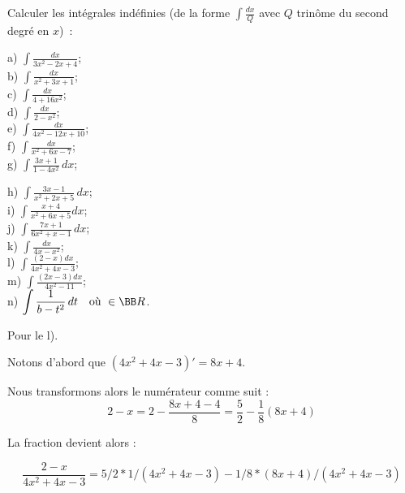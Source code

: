\documentclass[12pt,french,oneside,a4paper]{memoir} %
\begin{document}
\begin{exo}
Calculer les intégrales indéfinies (de la forme
$\displaystyle{\int\frac{dx}{Q}}$ avec $Q$ trinôme du second
degré en $x$)~:\\

\hfill
\begin{minipage}[t]{6cm}
a) $\displaystyle{\int \frac{dx}{3x^2-2x+4}}$;\\[2mm]
b) $\displaystyle{\int \frac{dx}{x^2+3x+1}}$;\\[2mm]
c) $\displaystyle{\int \frac{dx}{4+16x^2}}$;\\[2mm]
d) $\displaystyle{\int \frac{dx}{2-x^2}}$;\\[2mm]
e) $\displaystyle{\int \frac{dx}{4x^2-12x+10}}$;\\[2mm]
f) $\displaystyle{\int \frac{dx}{x^2+6x-7}}$;\\[2mm]
g) $\displaystyle{\int \frac{3x+1}{1-4x^2}\,dx}$;
\end{minipage}
\hfill
\begin{minipage}[t]{8cm}
h) $\displaystyle{\int \frac{3x-1}{x^2+2x+5}\,dx}$;\\[2mm]
i) $\displaystyle{\int \frac{x+4}{x^2+6x+5}dx}$;\\[2mm]
j) $\displaystyle{\int \frac{7x+1}{6x^2+x-1}\,dx}$;\\[2mm]
k) $\displaystyle{\int \frac{dx}{4x-x^2}}$;\\[2mm]
l) $\displaystyle{\int \frac{(2-x)dx}{4x^2+4x-3}}$;\\[2mm]
m) $\displaystyle{\int \frac{(2x-3)dx}{4x^2-11}}$;\\[2mm]
n) $\displaystyle{\int \frac{1}{b-t^2}\,dt\quad\mbox{où }\in{\BB R}}$.
\end{minipage}
\hfill

\begin{correction}

Pour le l).

Notons d'abord que $(4x^2 + 4x - 3)' = 8x + 4$.

Nous transformons alors le numérateur comme suit :
\begin{equation*}
2 - x = 2 - \frac{8x+4-4}{8} = \frac 52 - \frac 18 (8x+4)
\end{equation*}

La fraction devient alors :

\begin{equation*}
\frac{2-x}{4x^2+4x-3} =
5/2 * 1/(4x^2 + 4x - 3) - 1/8 * (8x+4)/(4x^2 + 4x - 3)
\end{equation*}



\end{correction}
\end{exo}
\end{document}
